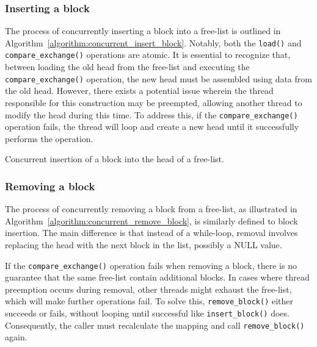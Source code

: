 \subsubsection{Inserting a block}

The process of concurrently inserting a block into a free-list is outlined in Algorithm~\ref{algorithm:concurrent_insert_block}. Notably, both the \texttt{load()} and \texttt{compare\_exchange()} operations are atomic. It is essential to recognize that, between loading the old head from the free-list and executing the \texttt{compare\_exchange()} operation, the new head must be assembled using data from the old head. However, there exists a potential issue wherein the thread responsible for this construction may be preempted, allowing another thread to modify the head during this time. To address this, if the \texttt{compare\_exchange()} operation fails, the thread will loop and create a new head until it successfully performs the operation.

\begin{algorithm}[H]
    \SetAlgoLined

\label{algorithm:concurrent_insert_block}
\caption{Concurrent insertion of a block into the head of a free-list.}
\end{algorithm}

\subsubsection{Removing a block}

The process of concurrently removing a block from a free-list, as illustrated in Algorithm~\ref{algorithm:concurrent_remove_block}, is similarly defined to block insertion. The main difference is that instead of a while-loop, removal involves replacing the head with the next block in the list, possibly a NULL value.

If the \texttt{compare\_exchange()} operation fails when removing a block, there is no guarantee that the same free-list contain additional blocks. In cases where thread preemption occurs during removal, other threads might exhaust the free-list, which will make further operations fail. To solve this, \texttt{remove\_block()} either succeeds or fails, without looping until successful like \texttt{insert\_block()} does. Consequently, the caller must recalculate the mapping and call \texttt{remove\_block()} again.

